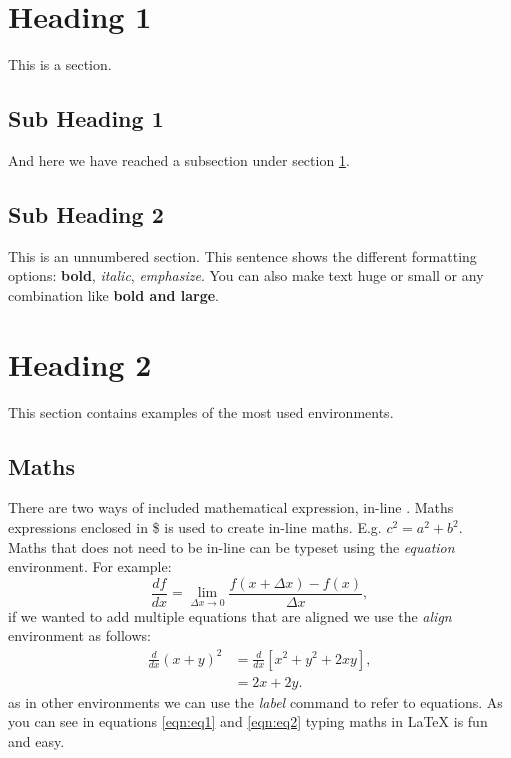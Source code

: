 \documentclass[a4paper,12pt]{article}
\begin{document}
\tableofcontents
\listoffigures
\listoftables
\newpage

\section{Heading 1}\label{sec:head1}
This is a section.
\subsection{Sub Heading 1}
And here we have reached a subsection under section \ref{sec:head1}.
\subsection*{Sub Heading 2}
This is an unnumbered section. This sentence shows the different formatting options: \textbf{bold}, \textit{italic}, \emph{emphasize}. You can also make text \huge{huge} or \small{small} or any combination like \textbf{\huge{bold and large}}.

\section{Heading 2}
This section contains examples of the most used environments.

\subsection{Maths}

There are two ways of included mathematical expression, in-line . Maths expressions enclosed in \$ is used to create in-line maths. E.g. $c^2=a^2+b^2$.\\

Maths that does not need to be in-line can be typeset using the \textit{equation} environment. For example:
\begin{equation}
\frac{d f}{dx}=\lim_{\Delta x \rightarrow 0}\frac{f(x+\Delta x)-f(x)}{\Delta x},
\label{eqn:eq1}
\end{equation}
if we wanted to add multiple equations that are aligned we use the \textit{align} environment as follows:
\begin{align}
\frac{d}{dx}(x+y)^{2}&=\frac{d}{dx}\left[ x^{2}+y^{2}+2xy\right], \nonumber\\
&=2x+2y. \label{eqn:eq2}
\end{align}
as in other environments we can use the \textit{label} command to refer to equations. As you can see in equations \ref{eqn:eq1} and \eqref{eqn:eq2} typing maths in \LaTeX{} is fun and easy.
\end{document}
